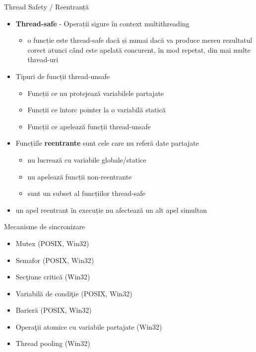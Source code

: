 \documentclass{so.cs.pub.ro}
\begin{document}
\begin{frame}{Thread Safety / Reentranță}
	\begin{itemize}
		\item {\bf Thread-safe} - Operații sigure în context multithreading
		\begin{itemize}
		\item o funcție este thread-safe dacă și numai dacă va produce mereu rezultatul corect atunci când este apelată concurent, în mod repetat, din mai multe thread-uri
   	\end{itemize}
   	\vspace{0.3cm}
		\item Tipuri de funcții thread-unsafe
		\begin{itemize}
   		\item Funcții ce nu protejează variabilele partajate
   		\item Funcții ce întorc pointer la o variabilă statică
   		\item Funcții ce apelează funcții thread-unsafe
   	\end{itemize}
   	\vspace{0.3cm}
   	\item Funcțiile {\bf reentrante} sunt cele care nu referă date partajate
		\begin{itemize}
			\item nu lucrează cu variabile globale/statice
   		\item nu apelează funcții non-reentrante
   		\item sunt un subset al funcțiilor thread-safe
	  	\end{itemize}
   	\vspace{0.1cm}
   	\item un apel reentrant în execuție nu afectează un alt apel simultan
   \end{itemize}
\end{frame}


\begin{frame}{Mecanisme de sincronizare}
	\begin{itemize}    %
		\item Mutex (POSIX, Win32)
		\item Semafor (POSIX, Win32)
		\item Secţiune critică (Win32)
		\item Variabilă de condiţie (POSIX, Win32)
		\item Barieră (POSIX, Win32)
		\item Operaţii atomice cu variabile partajate (Win32)
		\item Thread pooling (Win32)
	\end{itemize}
\end{frame}
\end{document}

